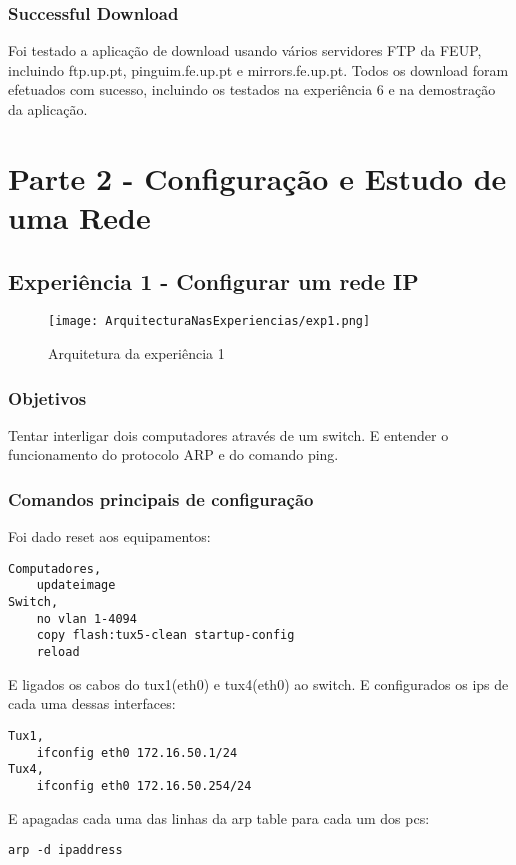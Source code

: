 \documentclass[a4paper]{article}
\begin{document}
\subsubsection{Successful Download}
Foi testado a aplicação de download usando vários servidores FTP da FEUP,
incluindo ftp.up.pt, pinguim.fe.up.pt e mirrors.fe.up.pt. Todos os download
foram efetuados com sucesso, incluindo os testados na experiência 6 e na
demostração da aplicação.

\section{Parte 2 - Configuração e Estudo de uma Rede}

\subsection{Experiência 1 - Configurar um rede IP}

\begin{figure}[h]
    \centering
    \texttt{[image: ArquitecturaNasExperiencias/exp1.png]}
    \caption{Arquitetura da experiência 1}
\end{figure}

\subsubsection{Objetivos}
Tentar interligar dois computadores através de um switch. E entender o
funcionamento do protocolo ARP e do comando ping.

\subsubsection{Comandos principais de configuração}
Foi dado reset aos equipamentos:
\begin{verbatim}
Computadores,
    updateimage
Switch,
    no vlan 1-4094
    copy flash:tux5-clean startup-config
    reload
\end{verbatim}

E ligados os cabos do tux1(eth0) e tux4(eth0) ao switch. E configurados os ips
de cada uma dessas interfaces:
\begin{verbatim}
Tux1,
    ifconfig eth0 172.16.50.1/24
Tux4,
    ifconfig eth0 172.16.50.254/24
\end{verbatim}

E apagadas cada uma das linhas da arp table para cada um dos pcs:
\begin{verbatim}
arp -d ipaddress
\end{verbatim}
\end{document}
